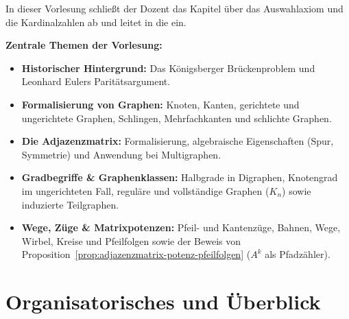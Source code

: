 


\begin{nice-box}
In dieser Vorlesung schließt der Dozent das Kapitel über das Auswahlaxiom und die Kardinalzahlen ab und leitet in die  ein.

\textbf{Zentrale Themen der Vorlesung:}
\begin{itemize}
    \item \textbf{Historischer Hintergrund:} Das Königsberger Brückenproblem und Leonhard Eulers Paritätsargument.
    \item \textbf{Formalisierung von Graphen:} Knoten, Kanten, gerichtete und ungerichtete Graphen, Schlingen, Mehrfachkanten und schlichte Graphen.
    \item \textbf{Die Adjazenzmatrix:} Formalisierung, algebraische Eigenschaften (Spur, Symmetrie) und Anwendung bei Multigraphen.
    \item \textbf{Gradbegriffe \& Graphenklassen:} Halbgrade in Digraphen, Knotengrad im ungerichteten Fall, reguläre und vollständige Graphen ($K_n$) sowie induzierte Teilgraphen.
    \item \textbf{Wege, Züge \& Matrixpotenzen:} Pfeil- und Kantenzüge, Bahnen, Wege, Wirbel, Kreise und Pfeilfolgen sowie der Beweis von Proposition~\ref{prop:adjazenzmatrix-potenz-pfeilfolgen} ($A^k$ als Pfadzähler).
\end{itemize}
\end{nice-box}

\section{Organisatorisches und Überblick}

